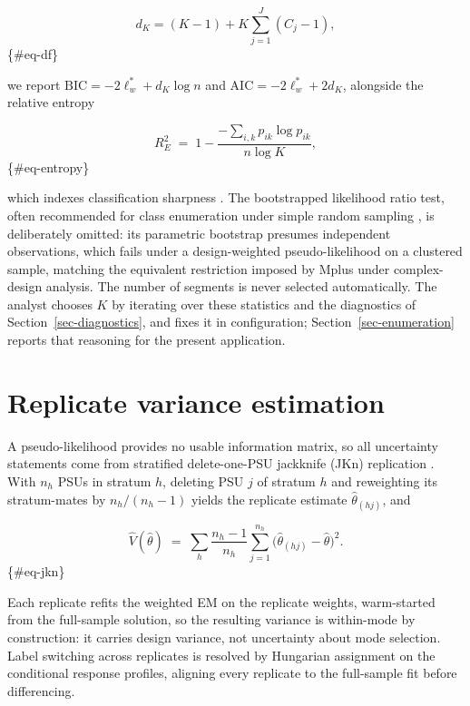 \documentclass[
  12pt]{article}
\begin{document}
\[d_K = (K - 1) + K \sum_{j=1}^{J} (C_j - 1),\] \{\#eq-df\}

we report \(\mathrm{BIC} = -2\ell^{*}_w + d_K \log n\) and
\(\mathrm{AIC} = -2\ell^{*}_w + 2 d_K\), alongside the relative entropy

\[R^2_E \;=\; 1 - \frac{-\sum_{i,k} p_{ik} \log p_{ik}}{\,n \log K\,},\]
\{\#eq-entropy\}

which indexes classification sharpness \citep{ramaswamy1993}. The
bootstrapped likelihood ratio test, often recommended for class
enumeration under simple random sampling \citep{nylund2007}, is
deliberately omitted: its parametric bootstrap presumes independent
observations, which fails under a design-weighted pseudo-likelihood on a
clustered sample, matching the equivalent restriction imposed by Mplus
under complex-design analysis. The number of segments is never selected
automatically. The analyst chooses \(K\) by iterating over these
statistics and the diagnostics of Section~\ref{sec-diagnostics}, and
fixes it in configuration; Section~\ref{sec-enumeration} reports that
reasoning for the present application.

\section{Replicate variance estimation}\label{sec-variance}

A pseudo-likelihood provides no usable information matrix, so all
uncertainty statements come from stratified delete-one-PSU jackknife
(JKn) replication \citep{wolter2007, rust1996, lumley2004}. With \(n_h\)
PSUs in stratum \(h\), deleting PSU \(j\) of stratum \(h\) and
reweighting its stratum-mates by \(n_h/(n_h - 1)\) yields the replicate
estimate \(\hat\theta_{(hj)}\), and

\[\widehat{V}(\hat\theta) \;=\; \sum_{h} \frac{n_h - 1}{n_h}
\sum_{j=1}^{n_h} \big( \hat\theta_{(hj)} - \hat\theta \big)^2 .\]
\{\#eq-jkn\}

Each replicate refits the weighted EM on the replicate weights,
warm-started from the full-sample solution, so the resulting variance is
within-mode by construction: it carries design variance, not uncertainty
about mode selection. Label switching across replicates is resolved by
Hungarian assignment \citep{kuhn1955, hornik2005} on the conditional
response profiles, aligning every replicate to the full-sample fit
before differencing.
\end{document}

